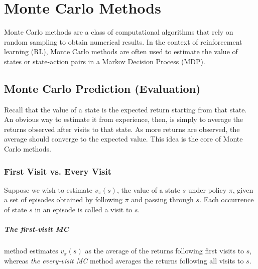\chapter{Monte Carlo Methods}
Monte Carlo methods are a class of computational algorithms that rely on random sampling to obtain numerical results. In the context of reinforcement learning (RL), Monte Carlo methods are often used to estimate the value of states or state-action pairs in a Markov Decision Process (MDP).


\section{Monte Carlo Prediction (Evaluation)}
Recall that the value of a state is the expected return starting from that state. An obvious way to estimate it from experience, then, is simply to average the returns observed after visits to that state. As more returns are observed, the average should converge to the expected value. This idea is the core of Monte Carlo methods. 

\subsection{First Visit vs. Every Visit}
Suppose we wish to estimate $v_\pi(s)$, the value of a state $s$ under policy $\pi$, given a set of episodes obtained by following $\pi$ and passing through $s$. Each occurrence of state $s$ in an episode is called a visit to $s$. 

\paragraph{The first-visit MC} method estimates $v_\pi(s)$ as the average of the returns following first visits to $s$, whereas \textit{the every-visit MC} method averages the returns following all visits to $s$.

